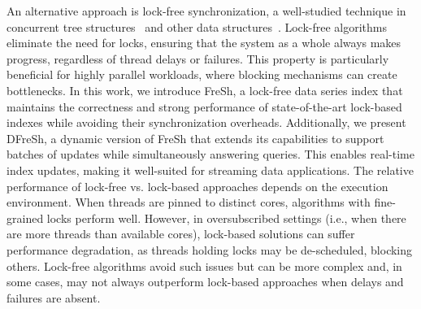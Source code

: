 An alternative approach is lock-free synchronization, a well-studied technique in concurrent 
tree structures~\cite{EFRB10,EFHR14,FR2018,ABF+22} and other data structures~\cite{F04,HS08,FKR18}. 
Lock-free algorithms eliminate the need for locks, ensuring that the system as a whole 
always makes progress, regardless of thread delays or failures. This property is particularly 
beneficial for highly parallel workloads, where blocking mechanisms can create bottlenecks. 
%
In this work, we introduce FreSh, a lock-free data series index that maintains the 
correctness and strong performance of state-of-the-art lock-based indexes while avoiding 
their synchronization overheads. Additionally, we present DFreSh, a dynamic version of 
FreSh that extends its capabilities to support batches of updates while simultaneously 
answering queries. This enables real-time index updates, making it well-suited for streaming
data applications.
%
The relative performance of lock-free vs. lock-based approaches depends on the execution environment.
When threads are pinned to distinct cores, algorithms with fine-grained locks perform well. 
However, in oversubscribed settings (i.e., when there are more threads than available cores),
lock-based solutions can suffer performance degradation, as threads holding locks may be
de-scheduled, blocking others. Lock-free algorithms avoid such issues but can be more complex and,
in some cases, may not always outperform lock-based approaches when delays and failures are absent.

